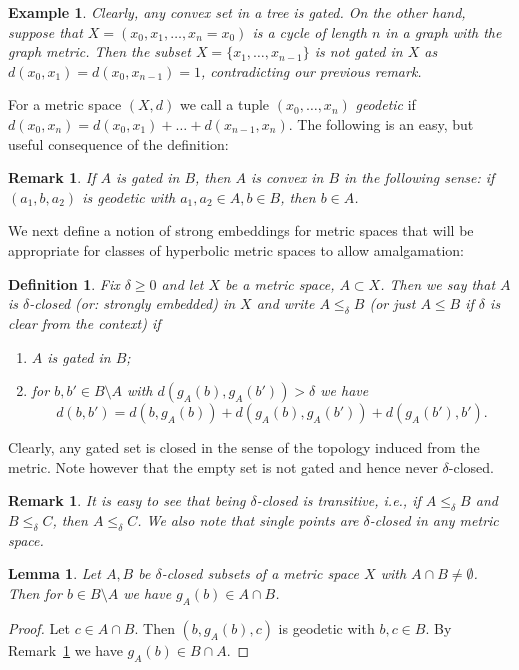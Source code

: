 \documentclass{amsart}
\renewcommand{\d}{\delta}
\newtheorem{definition}[defi]{Definition}
\newtheorem{lemma}[defi]{Lemma}
\newtheorem{remark}[defi]{Remark}
\newtheorem{example}[defi]{Example}
\begin{document}
\begin{example}\label{ex:cycle}
Clearly, any convex set in a tree is gated. On the other hand, 
suppose that $X=(x_0, x_1,\ldots, x_n=x_0)$ is a cycle of length $n$ in a graph with the graph metric. Then the subset $X=\{x_1,\ldots, x_{n-1}\}$ is not gated in $X$ as $d(x_0,x_1)=d(x_0,x_{n-1})=1$, contradicting our previous remark.
\end{example}


For a metric space $(X,d)$ we call a tuple $(x_0,\ldots, x_n)$ \emph{geodetic} if $d(x_0,x_n)=d(x_0,x_1)+\ldots+d(x_{n-1}, x_n)$. The following is an easy, but useful consequence of the definition:
\begin{remark}\label{rem:geodetic}
 If $A$ is gated in $B$, then $A$ is \emph{convex} in $B$ in the following sense: if $(a_1,b,a_2)$ is geodetic with $a_1, a_2\in A, b\in B$, then $b\in A$.
\end{remark}

We next define a notion of strong embeddings for metric spaces that will be appropriate for classes of hyperbolic metric spaces to allow amalgamation:

\begin{definition}\label{def:closed}
Fix $\d\geq 0$ and let $X$ be a metric space, $A\subset X$. Then we say that $A$ is $\d$-\emph{closed} (or: strongly embedded)   in $X$ and write $A\leq_\d B$ (or just $A\leq B$ if $\d$ is clear from the context) if
\begin{enumerate}
\item $A$ is gated in $B$;
\item for $b,b'\in B\setminus A$ with $d(g_A(b),g_A(b'))>\d$ we have \[d(b,b')=d(b,g_A(b))+d(g_A(b),g_A(b'))+d(g_A(b'),b').\]
\end{enumerate}
\end{definition}
Clearly, any gated set is closed in the sense of the topology induced from the metric. Note however that the empty set is not gated and hence never   $\d$-closed.



\begin{remark}\label{rem:closed}
It is easy to see that being   $\d$-closed is transitive, i.e., if $A\leq_\d B$ and $B\leq_\d C$, then $A\leq_\d C$.
We also note that single points are   $\d$-closed in any metric space.
\end{remark}

\begin{lemma}\label{lem:intersection}
Let $A, B$ be $\d$-closed subsets of a  metric space $X$ with $A\cap B\neq\emptyset$.  Then for $b\in B\setminus A$ we have $g_A(b)\in A\cap B$.
\end{lemma}
\begin{proof}
 Let $c\in A\cap B$.
Then $(b,g_A(b),c)$ is geodetic with $b,c\in B$. By Remark~\ref{rem:geodetic} we have   $g_A(b)\in B\cap A$.
\end{proof}
\end{document}
